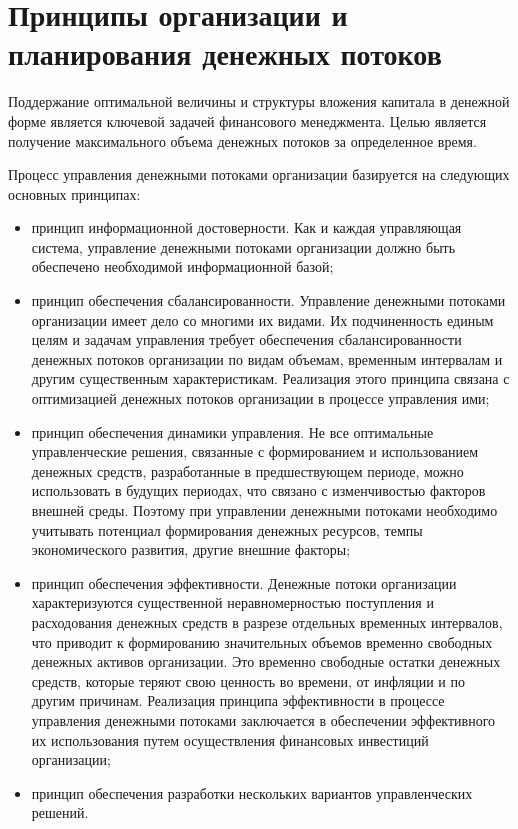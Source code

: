 \section{Принципы организации и планирования денежных потоков}

Поддержание оптимальной величины и структуры вложения капитала в денежной форме является ключевой задачей финансового менеджмента.
Целью является получение максимального объема денежных потоков за определенное время.

Процесс управления денежными потоками организации базируется на следующих основных принципах:
\begin{itemize}
	\item принцип информационной достоверности.
	Как и каждая управляющая система, управление денежными потоками организации должно быть обеспечено необходимой информационной базой;
	\item принцип обеспечения сбалансированности.
	Управление денежными потоками организации имеет дело со многими их видами.
	Их подчиненность единым целям и задачам управления требует обеспечения сбалансированности денежных потоков организации по видам объемам, временным интервалам и другим существенным характеристикам.
	Реализация этого принципа связана с оптимизацией денежных потоков организации в процессе управления ими;
	\item принцип обеспечения динамики управления.
	Не все оптимальные управленческие решения, связанные с формированием и использованием денежных средств, разработанные в предшествующем периоде, можно использовать в будущих периодах,	что связано с изменчивостью факторов внешней среды.
	Поэтому при управлении денежными потоками необходимо учитывать потенциал формирования денежных ресурсов, темпы экономического развития, другие внешние факторы;
	\item принцип обеспечения эффективности.
	Денежные потоки организации характеризуются существенной неравномерностью поступления и расходования денежных средств в разрезе	отдельных временных интервалов, что приводит к формированию значительных объемов временно свободных денежных активов организации.
	Это временно свободные остатки денежных	средств, которые теряют свою ценность во времени, от инфляции и по другим причинам.
	Реализация принципа эффективности в процессе управления денежными потоками заключается в обеспечении эффективного их использования путем осуществления финансовых инвестиций организации;
	\item принцип обеспечения разработки нескольких вариантов управленческих решений.

\end{itemize}
